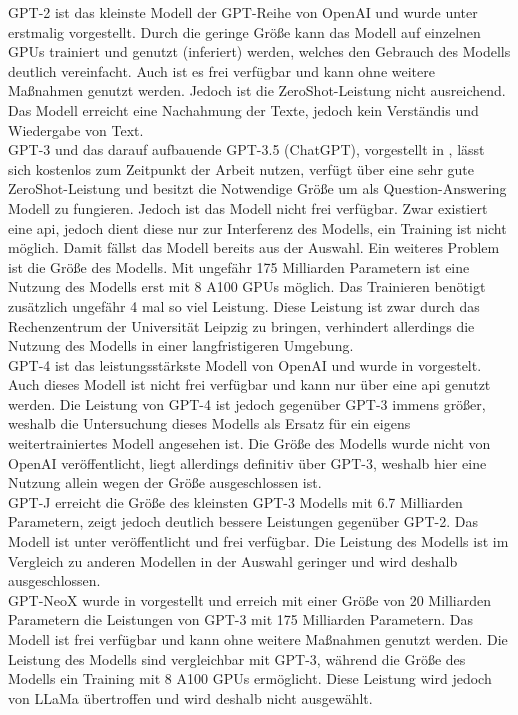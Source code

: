 GPT-2 ist das kleinste Modell der GPT-Reihe von OpenAI und wurde unter \citet{gpt2} erstmalig vorgestellt.
Durch die geringe Größe kann das Modell auf einzelnen GPUs trainiert und genutzt (inferiert) werden, welches den Gebrauch des Modells deutlich vereinfacht.
Auch ist es frei verfügbar und kann ohne weitere Maßnahmen genutzt werden. Jedoch ist die ZeroShot-Leistung nicht ausreichend.
Das Modell erreicht eine Nachahmung der Texte, jedoch kein Verständis und Wiedergabe von Text.\\

GPT-3 und das darauf aufbauende GPT-3.5 (ChatGPT), vorgestellt in \citet{gpt3}, lässt sich kostenlos zum Zeitpunkt der Arbeit nutzen, verfügt über eine sehr gute ZeroShot-Leistung und besitzt die Notwendige Größe um als Question-Answering Modell zu fungieren. Jedoch ist das Modell nicht frei verfügbar.
Zwar existiert eine \ac{api}, jedoch dient diese nur zur Interferenz des Modells, ein Training ist nicht möglich.
Damit fällst das Modell bereits aus der Auswahl. Ein weiteres Problem ist die Größe des Modells.
Mit ungefähr 175 Milliarden Parametern ist eine Nutzung des Modells erst mit 8 A100 GPUs möglich. Das Trainieren benötigt zusätzlich ungefähr 4 mal so viel Leistung.
Diese Leistung ist zwar durch das Rechenzentrum der Universität Leipzig zu bringen, verhindert allerdings die Nutzung des Modells in einer langfristigeren Umgebung.\\

GPT-4 ist das leistungsstärkste Modell von OpenAI und wurde in \citet{gpt4} vorgestelt.
Auch dieses Modell ist nicht frei verfügbar und kann nur über eine \ac{api} genutzt werden.
Die Leistung von GPT-4 ist jedoch gegenüber GPT-3 immens größer, weshalb die Untersuchung dieses Modells als Ersatz für ein eigens weitertrainiertes Modell angesehen ist.
Die Größe des Modells wurde nicht von OpenAI veröffentlicht, liegt allerdings definitiv über GPT-3, weshalb  hier eine Nutzung allein wegen der Größe ausgeschlossen ist.\\

GPT-J erreicht die Größe des kleinsten GPT-3 Modells mit 6.7 Milliarden Parametern, zeigt jedoch deutlich bessere Leistungen gegenüber GPT-2.
Das Modell ist unter \citet{gptj} veröffentlicht und frei verfügbar.
Die Leistung des Modells ist im Vergleich zu anderen Modellen in der Auswahl geringer und wird deshalb ausgeschlossen.\\

GPT-NeoX wurde in \citet{gpt_neox} vorgestellt und erreich mit einer Größe von 20 Milliarden Parametern die Leistungen von GPT-3 mit 175 Milliarden Parametern.
Das Modell ist frei verfügbar und kann ohne weitere Maßnahmen genutzt werden.
Die Leistung des Modells sind vergleichbar mit GPT-3, während die Größe des Modells ein Training mit 8 A100 GPUs ermöglicht.
Diese Leistung wird jedoch von LLaMa übertroffen und wird deshalb nicht ausgewählt.\\


